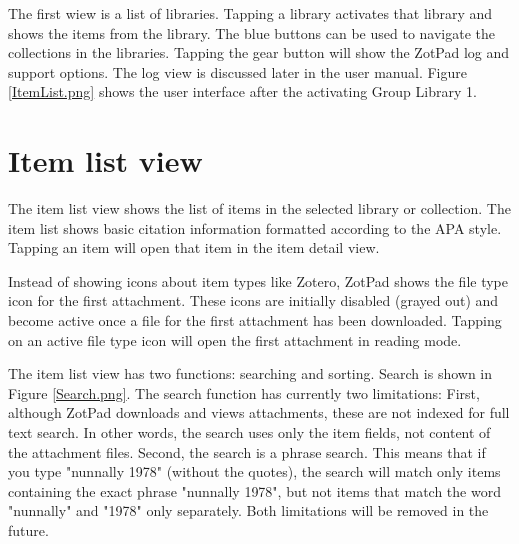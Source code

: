 \documentclass[oneside, openany, 12pt]{tufte-book}
\newcommand{\iphone}[1]{#1}
\newcommand{\ipad}[1]{}
\newcommand{\image}[2]{
	\center
	\fbox{\texttt{[image: images/iPhone/\{\#2]}}}

	\refstepcounter{figure}
	\smallskip\noindent\small Figure \thefigure: #1
	\label{#2}
	}
\newcommand{\ipadfootnote}[1]{}
\newcommand{\iphone}[1]{}
\newcommand{\ipad}[1]{#1}
\newcommand{\image}[2]{
	\caption{#1}
	\label{#2}
	\fbox{\texttt{[image: images/iPad/\{\#2]}}}
	}
\newcommand{\ipadfootnote}[1]{\footnote{#1}}
\begin{document}
\ipad{The bottom of the navigator shows cache status bar. This bar shows the number of items that are are queued for retrieval from the Zotero data server, and the number of files that are queud for downloading and uploading, and the amount of cache space used\ipadfootnote{The item downloads shows the number of toplevel items, attachments, and notes. For example, an article with an attachment and two notes is four items in the counter.}. Tapping the gear button will show the ZotPad log and support options. The log view is discussed later in the user manual.

Initially the navigator displays the list of libraries that you have access to.} \iphone{The first wiew is a list of libraries. } Tapping a library activates that library and shows the items from the library\ipad{ as a list in the content view}. The blue buttons can be used to navigate the collections in the libraries. \iphone{Tapping the gear button will show the ZotPad log and support options. The log view is discussed later in the user manual.} Figure \ref{ItemList.png} shows the user interface after the activating Group Library 1\ipad{ and tapping the round blue button to reveal the collections in the library}.

\FloatBarrier

\begin{figure}
\image{Item list\ipad{ and collections}}{ItemList.png}
\end{figure}

\section{Item list view}

The item list view shows the list of items in the selected library or collection. The item list shows basic citation information formatted according to the APA style. Tapping an item will open that item in the item detail view. 

Instead of showing icons about item types like Zotero, ZotPad shows the file type icon for the first attachment. These icons are initially disabled (grayed out) and become active once a file for the first attachment has been downloaded. Tapping on an active file type icon will open the first attachment in reading mode.

\begin{figure}
\image{Searching item list}{Search.png}
\end{figure}

The item list view has two functions: searching and sorting. Search is shown in Figure \ref{Search.png}. The search function has currently two limitations: First, although ZotPad downloads and views attachments, these are not indexed for full text search. In other words, the search uses only the item fields, not content of the attachment files. Second, the search is a phrase search. This means that if you type "nunnally 1978" (without the quotes), the search will match only items containing the exact phrase "nunnally 1978", but not items that match the word "nunnally" and "1978" only separately. Both limitations will be removed in the future.
\end{document}
